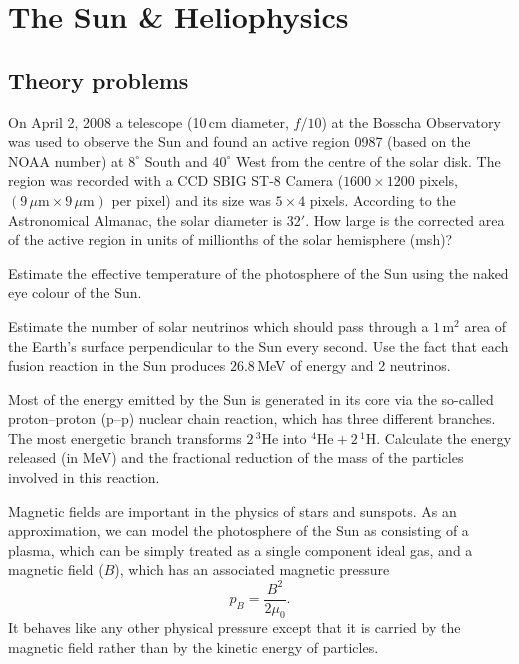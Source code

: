 \chapter{The Sun \& Heliophysics}

\section*{Theory problems}

On April 2, 2008 a telescope (10\,cm diameter, $f/10$) at the Bosscha
Observatory was used to observe the Sun and found an active region 0987 (based
on the NOAA number) at $8^\circ$ South and $40^\circ$ West from the centre of
the solar disk. The region was recorded with a CCD SBIG ST-8 Camera
($1600 \times 1200$ pixels, $(9\,\mu\mathrm{m} \times 9\,\mu\mathrm{m})$ per
pixel) and its size was $5 \times 4$ pixels. According to the Astronomical
Almanac, the solar diameter is $32'$. How large is the corrected area of the
active region in units of millionths of the solar hemisphere (msh)?

Estimate the effective temperature of the photosphere of the Sun using the naked
eye colour of the Sun.

Estimate the number of solar neutrinos which should pass through a
$1\,\mathrm{m}^2$ area of the Earth's surface perpendicular to the Sun every
second. Use the fact that each fusion reaction in the Sun produces
$26.8$\,MeV of energy and 2 neutrinos.

Most of the energy emitted by the Sun is generated in its core via the so-called
proton--proton (p--p) nuclear chain reaction, which has three different
branches. The most energetic branch transforms $2\,^{3}\mathrm{He}$ into
$^{4}\mathrm{He} + 2\,^{1}\mathrm{H}$. Calculate the energy released (in MeV)
and the fractional reduction of the mass of the particles involved in this
reaction.


Magnetic fields are important in the physics of stars and sunspots. As an
approximation, we can model the photosphere of the Sun as consisting of a
plasma, which can be simply treated as a single component ideal gas, and a
magnetic field ($B$), which has an associated magnetic pressure
\[ p_B = \frac{B^2}{2\mu_0}. \]
It behaves like any other physical pressure except that it is carried by the
magnetic field rather than by the kinetic energy of particles.

